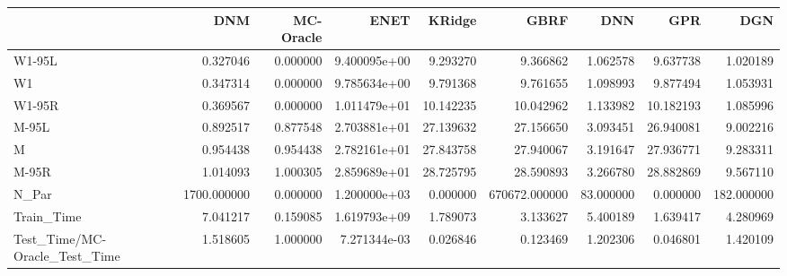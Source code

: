 \begin{tabular}{lrrrrrrrr}
\toprule
{} &          DNM &  MC-Oracle &          ENET &     KRidge &           GBRF &        DNN &        GPR &         DGN \\
\midrule
W1-95L                        &     0.327046 &   0.000000 &  9.400095e+00 &   9.293270 &       9.366862 &   1.062578 &   9.637738 &    1.020189 \\
W1                            &     0.347314 &   0.000000 &  9.785634e+00 &   9.791368 &       9.761655 &   1.098993 &   9.877494 &    1.053931 \\
W1-95R                        &     0.369567 &   0.000000 &  1.011479e+01 &  10.142235 &      10.042962 &   1.133982 &  10.182193 &    1.085996 \\
M-95L                         &     0.892517 &   0.877548 &  2.703881e+01 &  27.139632 &      27.156650 &   3.093451 &  26.940081 &    9.002216 \\
M                             &     0.954438 &   0.954438 &  2.782161e+01 &  27.843758 &      27.940067 &   3.191647 &  27.936771 &    9.283311 \\
M-95R                         &     1.014093 &   1.000305 &  2.859689e+01 &  28.725795 &      28.590893 &   3.266780 &  28.882869 &    9.567110 \\
N\_Par                         &  1700.000000 &   0.000000 &  1.200000e+03 &   0.000000 &  670672.000000 &  83.000000 &   0.000000 &  182.000000 \\
Train\_Time                    &     7.041217 &   0.159085 &  1.619793e+09 &   1.789073 &       3.133627 &   5.400189 &   1.639417 &    4.280969 \\
Test\_Time/MC-Oracle\_Test\_Time &     1.518605 &   1.000000 &  7.271344e-03 &   0.026846 &       0.123469 &   1.202306 &   0.046801 &    1.420109 \\
\bottomrule
\end{tabular}
